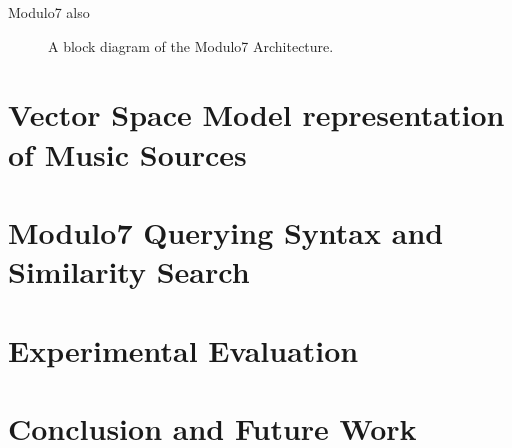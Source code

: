 \documentclass{article}
\begin{document}
Modulo7 also 

\begin{figure}
 \centerline{}
 \caption{A block diagram of the Modulo7 Architecture.}
 \label{fig:architecture}
\end{figure}

\section{Vector Space Model representation of Music Sources} \label{vecmodels}


 
\section{Modulo7 Querying Syntax and Similarity Search}


\section{Experimental Evaluation}

\section{Conclusion and Future Work}



\end{document}
